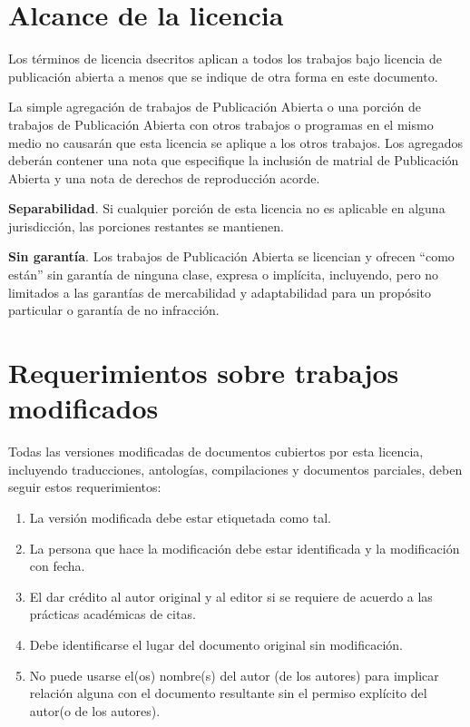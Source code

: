 \section{Alcance de la licencia}

Los términos de licencia dsecritos aplican a todos los trabajos bajo
licencia de publicación abierta a menos que se indique de otra forma
en este documento.

La simple agregación de trabajos de Publicación Abierta o una porción
de trabajos de Publicación Abierta con otros trabajos o programas en
el mismo medio no causarán que esta licencia se aplique a los otros
trabajos.  Los agregados deberán contener una nota que especifique la
inclusión de matrial de Publicación Abierta y una nota de derechos de
reproducción acorde.

\textbf{Separabilidad}. Si cualquier porción de esta licencia no es
aplicable en alguna jurisdicción, las porciones restantes se
mantienen.

\textbf{Sin garantía}.  Los trabajos de Publicación Abierta se
licencian y ofrecen ``como están'' sin garantía de ninguna clase,
expresa o implícita, incluyendo, pero no limitados a las garantías de
mercabilidad y adaptabilidad para un propósito particular o garantía
de no infracción.

\section{Requerimientos sobre trabajos modificados}

Todas las versiones modificadas de documentos cubiertos por esta
licencia, incluyendo traducciones, antologías, compilaciones y
documentos parciales, deben seguir estos requerimientos:

\begin{enumerate}
\item La versión modificada debe estar etiquetada como tal.
\item La persona que hace la modificación debe estar identificada y la
  modificación con fecha.
\item El dar crédito al autor original y al editor si se requiere de
  acuerdo a las prácticas académicas de citas.
\item Debe identificarse el lugar del documento original sin
  modificación.
\item No puede usarse el(os) nombre(s) del autor (de los autores) para
  implicar relación alguna con el documento resultante sin el permiso
  explícito del autor(o de los autores).
\end{enumerate}

